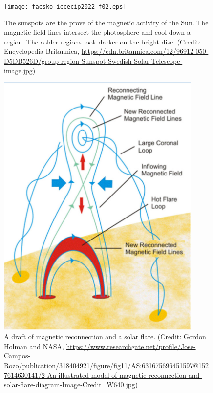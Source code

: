 \documentclass[sn-aps]{sn-jnl}%
\begin{document}
\begin{figure}[t]
\centering
\texttt{[image: facsko\_iccecip2022-f02.eps]}
\caption{The sunspots are the prove of the magnetic activity of the Sun. The magnetic field lines intersect the photosphere and cool down a region. The colder regions look darker on the bright disc. (Credit: Encyclopedia Britannica, \url{https://cdn.britannica.com/12/96912-050-D5DB526D/group-region-Sunspot-Swedish-Solar-Telescope-image.jpg})}\label{fig:sunspot}
\end{figure}


\begin{figure}[t]
\centering
\includegraphics[width=0.9\textwidth]{facsko_iccecip2022-f03.eps}
\caption{A draft of magnetic reconnection and a solar flare. (Credit: Gordon Holman and NASA, \url{https://www.researchgate.net/profile/Jose-Campos-Rozo/publication/318404921/figure/fig11/AS:631675696451597@1527614630141/2-An-illustrated-model-of-magnetic-reconnection-and-solar-flare-diagram-Image-Credit_W640.jpg})}\label{fig:reconnection}
\end{figure}
\end{document}
